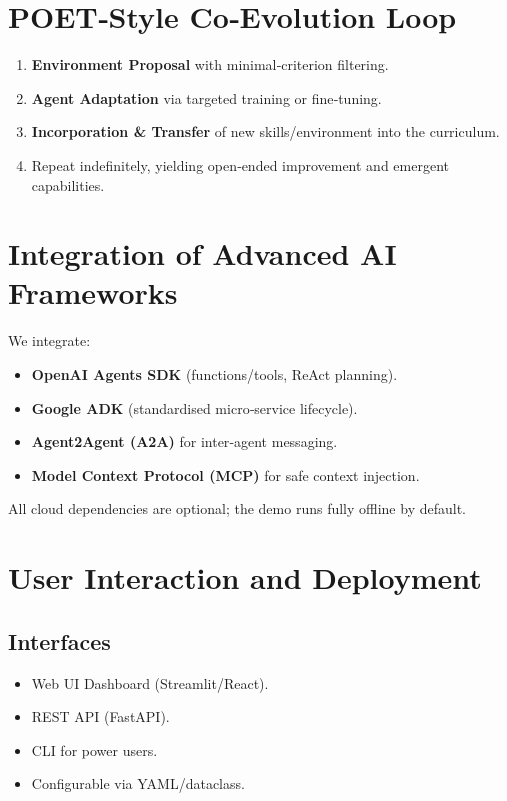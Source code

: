 \documentclass{article}
\begin{document}
\section*{POET‑Style Co‑Evolution Loop}

\begin{enumerate}[leftmargin=*]
  \item \textbf{Environment Proposal} with minimal‑criterion filtering.
  \item \textbf{Agent Adaptation} via targeted training or fine‑tuning.
  \item \textbf{Incorporation \& Transfer} of new skills/environment into the curriculum.
  \item Repeat indefinitely, yielding open‑ended improvement and emergent capabilities.
\end{enumerate}

\section*{Integration of Advanced AI Frameworks}

We integrate:

\begin{itemize}[leftmargin=*]
  \item \textbf{OpenAI Agents SDK} (functions/tools, ReAct planning).
  \item \textbf{Google ADK} (standardised micro‑service lifecycle).
  \item \textbf{Agent2Agent (A2A)} for inter‑agent messaging.
  \item \textbf{Model Context Protocol (MCP)} for safe context injection.
\end{itemize}

All cloud dependencies are optional; the demo runs fully offline by default.

\section*{User Interaction and Deployment}

\subsection*{Interfaces}

\begin{itemize}[leftmargin=*]
  \item Web UI Dashboard (Streamlit/React).
  \item REST API (FastAPI).
  \item CLI for power users.
  \item Configurable via YAML/dataclass.
\end{itemize}
\end{document}
